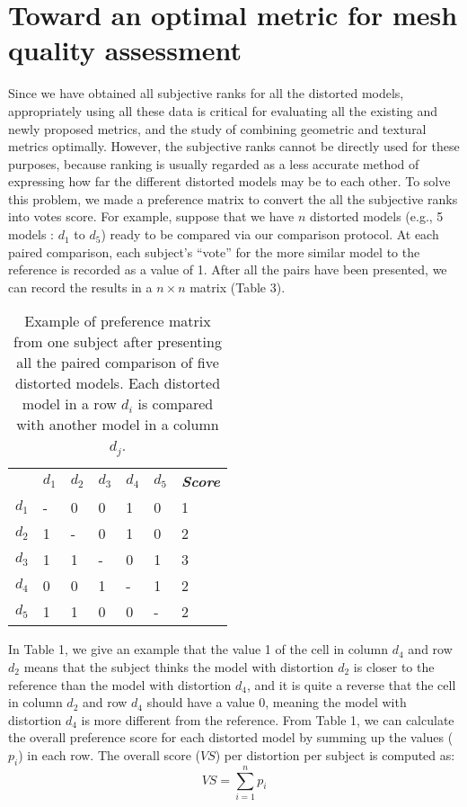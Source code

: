 \section{Toward an optimal metric for mesh quality assessment}
Since we have obtained all subjective ranks for all the distorted models, appropriately using all these data is critical for evaluating all the existing and newly proposed metrics, and the study of combining geometric and textural metrics optimally. However, the subjective ranks cannot be directly used for these purposes, because ranking is usually regarded as a less accurate method of expressing how far the different distorted models may be to each other.  To solve this problem, we made a preference matrix \cite{Ledda_2005} to convert the all the subjective ranks into votes score. For example, suppose that we have $n$ distorted models (e.g., 5 models : $d_1$ to $d_5$) ready to be compared via our comparison protocol.   At each paired comparison, each subject’s “vote” for the more similar model to the reference is recorded as a value of 1. After all the pairs have been presented, we can record the results in a $n \times n$ matrix (Table 3).
\begin{table}[]
\centering
\caption{Example of preference matrix from one subject after presenting all the paired comparison of five distorted models. Each distorted model in a row $d_i$ is compared with another model in a column $d_j$.}
\label{my-label}
\begin{tabular}{lllllll}
            & $d_1$ & $d_2$ & $d_3$ & $d_4$ & $d_5$ & \textit{\textbf{Score}} \\
$d_1$ & -           & 0           & 0           & 1           & 0           & 1     \\
$d_2$ & 1           & -           & 0           & 1           & 0           & 2     \\
$d_3$ & 1           & 1           & -           & 0           & 1           & 3     \\
$d_4$ & 0           & 0           & 1           & -           & 1           & 2     \\
$d_5$ & 1           & 1           & 0           & 0           & -           & 2    
\end{tabular}
\end{table}
In Table 1, we give an example that the value 1 of the cell in column $d_4$ and row $d_2$ means that the subject thinks the model with distortion $d_2$ is closer to the reference than the model with distortion $d_4$, and it is quite a reverse that the cell in column $d_2$ and row $d_4$ should have a value 0, meaning the model with distortion $d_4$ is more different from the reference. From Table 1, we can calculate the overall preference score for each distorted model by summing up the values ($p_i$) in each row. The overall score ($VS$) per distortion per subject is computed as:
\begin{equation}
VS =\sum_{i=1}^n{p_i}
\end{equation}